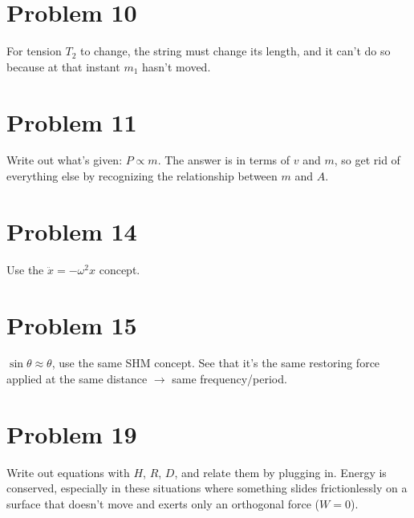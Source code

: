 \documentclass[11pt]{article}
\begin{document}
\begin{center}
\end{center}

\section*{Problem 10}
For tension $T_2$ to change, the string must change its length, and it can't do so because at that instant $m_1$ hasn't moved.

\section*{Problem 11}
Write out what's given: $P\propto m$.
The answer is in terms of $v$ and $m$, so get rid of everything else by recognizing the relationship between $m$ and $A$.

\section*{Problem 14}
Use the $\ddot{x}=-\omega^2x$ concept.

\section*{Problem 15}
$\sin\theta\approx\theta$, use the same SHM concept.
See that it's the same restoring force applied at the same distance $\to$ same frequency/period.

\section*{Problem 19}
Write out equations with $H$, $R$, $D$, and relate them by plugging in.
Energy is conserved, especially in these situations where something slides frictionlessly on a surface that doesn't move and exerts only an orthogonal force ($W=0$).
\end{document}
